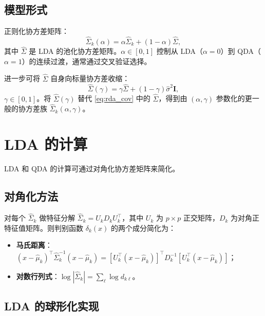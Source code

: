 \subsection{模型形式}

正则化协方差矩阵：
\begin{equation}\label{eq:rda_cov}
    \hat{\Sigma}_k(\alpha) = \alpha \hat{\Sigma}_k + (1 - \alpha) \hat{\Sigma},
\end{equation}
其中 $\hat{\Sigma}$ 是 LDA 的池化协方差矩阵。$\alpha \in [0,1]$ 控制从 LDA（$\alpha=0$）到 QDA（$\alpha=1$）的连续过渡，通常通过交叉验证选择。

进一步可将 $\hat{\Sigma}$ 自身向标量协方差收缩：
\begin{equation}\label{eq:rda_scalar}
    \hat{\Sigma}(\gamma) = \gamma \hat{\Sigma} + (1 - \gamma) \hat{\sigma}^2 \mathbf{I},
\end{equation}
$\gamma \in [0,1]$。将 $\hat{\Sigma}(\gamma)$ 替代 \eqref{eq:rda_cov} 中的 $\hat{\Sigma}$，得到由 $(\alpha, \gamma)$ 参数化的更一般的协方差族 $\hat{\Sigma}_k(\alpha, \gamma)$。




\section{LDA 的计算}

LDA 和 QDA 的计算可通过对角化协方差矩阵来简化。

\subsection{对角化方法}

对每个 $\hat{\Sigma}_k$ 做特征分解 $\hat{\Sigma}_k = U_k D_k U_k^\top$，其中 $U_k$ 为 $p \times p$ 正交矩阵，$D_k$ 为对角正特征值矩阵。则判别函数 $\delta_k(x)$ 的两个成分简化为：

\begin{itemize}
    \item \textbf{马氏距离}：$(x - \hat{\mu}_k)^\top \hat{\Sigma}_k^{-1}(x - \hat{\mu}_k) = [U_k^\top(x - \hat{\mu}_k)]^\top D_k^{-1} [U_k^\top(x - \hat{\mu}_k)]$；
    \item \textbf{对数行列式}：$\log|\hat{\Sigma}_k| = \sum_{\ell} \log d_{k\ell}$。
\end{itemize}

\subsection{LDA 的球形化实现}

